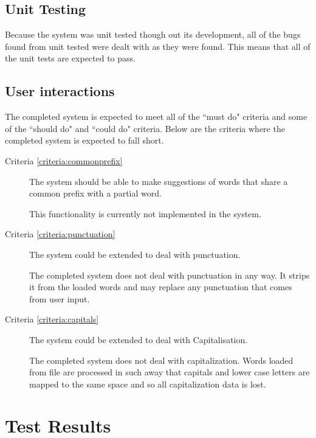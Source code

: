 \documentclass[10pt]{article} %
\begin{document}
		\subsection{Unit Testing}
		Because the system was unit tested though out its development, all of the bugs found from unit tested were dealt with as they were found. This means that all of the unit tests are expected to pass.
		
		\subsection{User interactions}
		The completed system is expected to meet all of the ``must do" criteria and some of the ``should do" and ``could do" criteria. Below are the criteria where the completed system is expected to fall short.
		
		\begin{description}
		    
			\item [Criteria \ref{criteria:commonprefix} ] The system should be able to make suggestions of words that share a common prefix with a partial word.
			
			This functionality is currently not implemented in the system.
			
		    \item [Criteria \ref{criteria:punctuation} ] The system could be extended to deal with punctuation.
		    
		    The completed system does not deal with punctuation in any way. It strips it from the loaded words and may replace any punctuation that comes from user input.
			
			\item [Criteria  \ref{criteria:capitals} ] The system could be extended to deal with Capitalisation.
			
			The completed system does not deal with capitalization. Words loaded from file are processed in such away that capitals and lower case letters are mapped to the same space and so all capitalization data is lost.
			
			
        \end{description}

	\section{Test Results}
\end{document}
